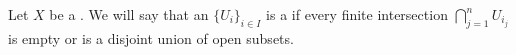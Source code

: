 \begin{definition} \label{definition:semi_good_open_cover_of_a_topological_space}
    Let $X$ be a . 
    We will say that an  $\{U_i\}_{i \in I}$ is a  if every finite intersection $\bigcap_{j=1}^n U_{i_j}$ is empty or is a disjoint union of  open subsets.
\end{definition}
